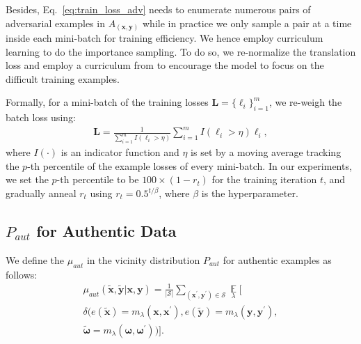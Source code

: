 \documentclass[11pt,a4paper]{article}
\def\S{\mathcal{S}} \def\cS{\vert \mathcal{S} \vert}
\def\bx{\mathbf{x}} \def\bxp{\mathbf{x}^{\prime}} \def\bxpp{\mathbf{x}^{\prime\prime}} \def\tbx{\tilde{\mathbf{x}}} \def\hbx{\hat{\mathbf{x}}} \def\ex{e(\mathbf{x})}
\def\tex{e({\tilde{\mathbf{x}}})}
\def\by{\mathbf{y}} \def\byp{\mathbf{y}^{\prime}} \def\bypp{\mathbf{y}^{\prime\prime}} \def\tby{\tilde{\mathbf{y}}} \def\hby{\hat{\mathbf{y}}} \def\ey{e(\mathbf{y})}
\def\tey{e({\tilde{\mathbf{y}}})}
\def\Axy{A_{(\mathbf{x}, \mathbf{y})}}
\begin{document}
Besides, Eq.~\eqref{eq:train_loss_adv} needs to enumerate numerous pairs of adversarial examples in $\Axy$ while in practice we only sample a pair at a time inside each mini-batch for training efficiency.
We hence employ curriculum learning to do the importance sampling. To do so, we re-normalize the translation loss and employ a curriculum from \cite{jiang2017mentornet} to encourage the model to focus on the difficult training examples. 

Formally, for a mini-batch of the training losses $\mathbf{L}=\{\ell_{i} \}_{i=1}^m$, we re-weigh the batch loss using:
\begin{eqnarray}
\mathbf{L} = \frac{1}{\sum_{i=1}^m I(\ell_{i} > \eta) } \sum_{i=1}^m I(\ell_{i} > \eta) \ell_{i},
\label{eq:loss_reweight}
\end{eqnarray}
where $I(\cdot)$ is an indicator function and $\eta$ is set by a moving average tracking the $p$-th percentile of the example losses of every mini-batch. In our experiments, we set the $p$-th percentile to be $100 \times (1-r_{t})$ for the training iteration $t$, 
and gradually anneal $r_t$ using $r_{t} = 0.5^{t/\beta}$, where $\beta$ is the hyperparameter.
\subsection{$P_{aut}$ for Authentic Data}
We define the $\mu_{aut}$  in the vicinity distribution $P_{aut}$ for authentic examples as follows:
\begin{eqnarray}
\mu_{aut}(\tbx, \tby | \bx, \by) = \frac{1}{\cS} \sum\limits_{(\bxp, \byp) \in \S} \mathop{\mathbb{E}}\limits_{\lambda}[ \nonumber \\ \delta(\tex=m_{\lambda}(\bx, \bxp), 
\tey=m_{\lambda}(\by, \byp), \nonumber \\
\tilde{\bm{\omega}}=m_{\lambda}(\bm{\omega}, \bm{\omega^{\prime}}))].
\label{eq:mu_aut}
\end{eqnarray}
\end{document}
